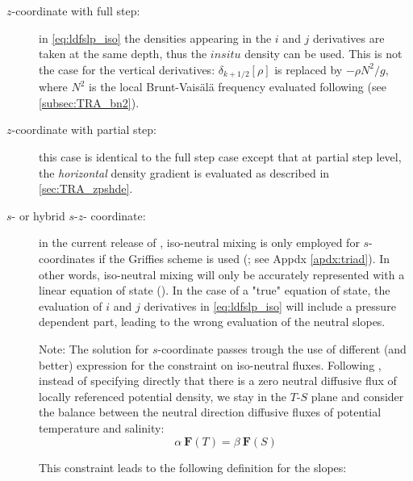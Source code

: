 \documentclass[../tex_main/NEMO_manual]{subfiles}
\begin{document}
\begin{description}

\item[$z$-coordinate with full step: ]
  in \autoref{eq:ldfslp_iso} the densities appearing in the $i$ and $j$ derivatives  are taken at the same depth,
  thus the $in situ$ density can be used.
  This is not the case for the vertical derivatives: $\delta_{k+1/2}[\rho]$ is replaced by $-\rho N^2/g$,
  where $N^2$ is the local Brunt-Vais\"{a}l\"{a} frequency evaluated following \citet{McDougall1987}
  (see \autoref{subsec:TRA_bn2}). 

\item[$z$-coordinate with partial step: ]
  this case is identical to the full step case except that at partial step level,
  the \emph{horizontal} density gradient is evaluated as described in \autoref{sec:TRA_zpshde}.

\item[$s$- or hybrid $s$-$z$- coordinate: ]
  in the current release of \NEMO, iso-neutral mixing is only employed for $s$-coordinates if
  the Griffies scheme is used (;
  see Appdx \autoref{apdx:triad}).
  In other words, iso-neutral mixing will only be accurately represented with a linear equation of state
  ().
  In the case of a "true" equation of state, the evaluation of $i$ and $j$ derivatives in \autoref{eq:ldfslp_iso}
  will include a pressure dependent part, leading to the wrong evaluation of the neutral slopes.

  Note: The solution for $s$-coordinate passes trough the use of different (and better) expression for
  the constraint on iso-neutral fluxes.
  Following \citet{Griffies_Bk04}, instead of specifying directly that there is a zero neutral diffusive flux of
  locally referenced potential density, we stay in the $T$-$S$ plane and consider the balance between
  the neutral direction diffusive fluxes of potential temperature and salinity:
\begin{equation}
\alpha \ \textbf{F}(T) = \beta \ \textbf{F}(S)
\end{equation}

This constraint leads to the following definition for the slopes:


\end{description}
\end{document}
